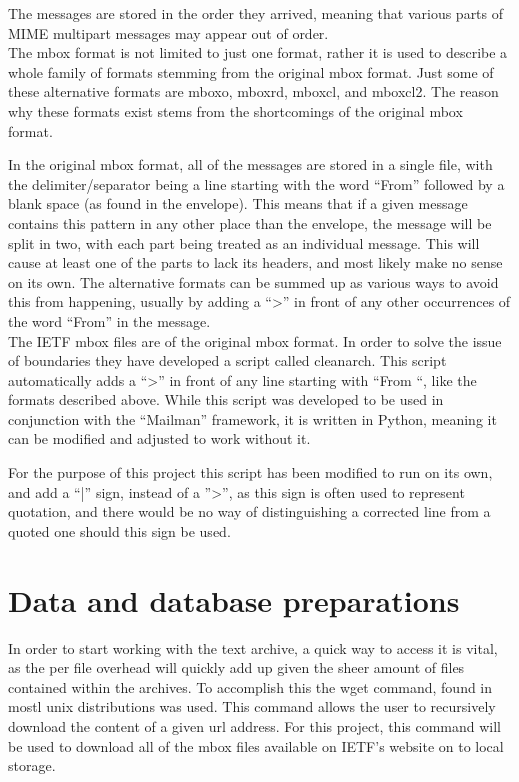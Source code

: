 \documentclass[a4paper,english]{report}
\begin{document}
The messages are stored in the order they arrived, meaning that various parts of  MIME multipart messages may appear out of order.\\

\noindent
The mbox format is not limited to just one format, rather it is used to describe a whole family of formats stemming from the original mbox format. 
Just some of these alternative formats are mboxo, mboxrd, mboxcl, and mboxcl2.
The reason why these formats exist stems from the shortcomings of the original mbox format.

In the original mbox format, all of the messages are stored in a single file, with the delimiter/separator being a line starting with the word “From” followed by a blank space (as found in the envelope). 
This means that if a given message contains this pattern in any other place than the envelope, the message will be split in two, with each part being treated as an individual message. This will cause at least one of the parts to lack its headers, and most likely make no sense on its own.
The alternative formats can be summed up as various ways to avoid this from happening, usually by adding a “>” in front of any other occurrences of the word “From” in the message.\\

The IETF mbox files are of the original mbox format. In order to solve the issue of boundaries they have developed a script called cleanarch. This script automatically adds a “>” in front of any line starting with “From “, like the formats described above. While this script was developed to be used in conjunction with the “Mailman” framework, it is written in Python, meaning it can be modified and adjusted to work without it.

For the purpose of this project this script has been modified to run on its own, and add a “|” sign, instead of a ''>'', as this sign is often used to represent quotation, and there would be no way of distinguishing a corrected line from a quoted one should this sign be used.





\chapter{Data and database preparations}



In order to start working with the text archive, a quick way to access it is vital, as the per file overhead will quickly add up given the sheer amount of files contained within the archives.
To accomplish this the wget command, found in mostl unix distributions was used. This command allows the user to recursively download the content of a given url address. For this project, this command will be used to download all of the mbox files available on IETF's website on to local storage.\\\\
\end{document}
